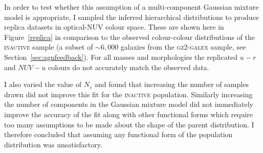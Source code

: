 

In order to test whether this assumption of a multi-component Gaussian mixture model is appropriate, I sampled the inferred hierarchical distributions to produce replica datasets in optical-NUV colour space. These are shown here in Figure~\ref{replica}  in comparison to the observed colour-colour distributions of the \textsc{inactive} sample (a subset of $\sim6,000$ galaxies from the \textsc{gz2-galex} sample, see Section~\ref{sec:agnfeedback}). For all masses and morphologies the replicated $u-r$ and $NUV-u$ colours do not accurately match the observed data. 


I also varied the value of $N_s$ and found that increasing the number of samples drawn did not improve this fit for the \textsc{inactive} population. Similarly increasing the number of components in the Gaussian mixture model did not immediately improve the accuracy of the fit along with other functional forms which require too many assumptions to be made about the shape of the parent distribution. I therefore concluded that assuming any functional form of the population distribution was unsatisfactory. %

